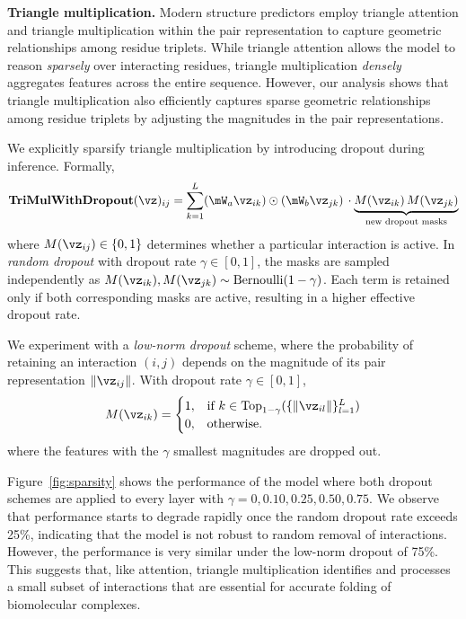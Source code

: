 \documentclass{article} %
\renewcommand{\paragraph}[1]{\vspace{1.25mm}\noindent\textbf{#1}}
\newcommand{\reffig}[1]{Figure~\ref{fig:#1}}
\begin{document}
\paragraph{Triangle multiplication. }
Modern structure predictors employ triangle attention and triangle multiplication within the pair representation to capture geometric relationships among residue triplets.
While triangle attention allows the model to reason \textit{sparsely} over interacting residues, triangle multiplication \textit{densely} aggregates features across the entire sequence.
However, our analysis shows that triangle multiplication also efficiently captures sparse geometric relationships among residue triplets by adjusting the magnitudes in the pair representations.

We explicitly sparsify triangle multiplication by introducing dropout during inference.
Formally,
\[
\mathbf{TriMulWithDropout}(\vz)_{ij} =
\sum_{k=1}^L (\mW_a \vz_{ik}) \odot (\mW_b \vz_{jk})
\, \cdot \underbrace{M(\vz_{ik}) \, M(\vz_{jk})}_{\text{new dropout masks}}
\]
where \(M(\vz_{ij}) \in \{0,1\}\) determines whether a particular interaction is active.
In \textit{random dropout} with dropout rate \(\gamma \in [0,1]\), the masks are sampled independently as
$M(\vz_{ik}), M(\vz_{jk}) \sim \mathrm{Bernoulli}(1-\gamma)$.
Each term is retained only if both corresponding masks are active, resulting in a higher effective dropout rate.

We experiment with a \textit{low-norm dropout} scheme, where the probability of retaining an interaction $(i,j)$ depends on the magnitude of its pair representation \(\|\vz_{ij}\|\).
With dropout rate \(\gamma \in [0,1]\), %
\[
M(\vz_{ik}) =
\begin{cases}
1, & \text{if } k \in \text{Top}_{1-\gamma}({\{\|\vz_{il}\|\}_{l=1}^L}) \\
0, & \text{otherwise}.
\end{cases}
\]
where the features with the $\gamma$ smallest magnitudes are dropped out.

\reffig{sparsity} shows the performance of the model where both dropout schemes are applied to every layer with $\gamma=0,0.10,0.25,0.50,0.75$.
We observe that performance starts to degrade rapidly once the random dropout rate exceeds 25\%, indicating that the model is not robust to random removal of interactions.
However, the performance is very similar under the low-norm dropout of 75\%.
This suggests that, like attention, triangle multiplication identifies and processes a small subset of interactions that are essential for accurate folding of biomolecular complexes.
\end{document}
